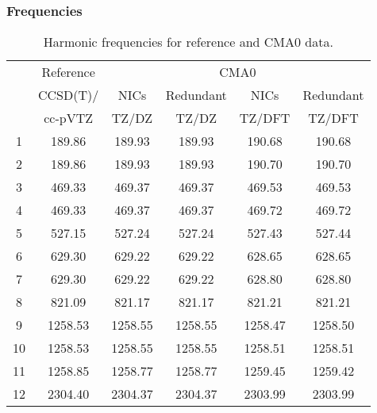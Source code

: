 \documentclass[10pt,oneside]{article}
\begin{document}
\begin{table}[h!]
\subsubsection*{Frequencies}
\centering
\caption{Harmonic frequencies for reference and CMA0 data.}
\begin{tabular}{cccccc}
\toprule
{} & Reference & \multicolumn{4}{c}{CMA0} \\
{} &  CCSD(T)/ &    NICs &  Redundant &    NICs & Redundant \\
{} &   cc-pVTZ &   TZ/DZ &      TZ/DZ &  TZ/DFT &    TZ/DFT \\
\midrule
1  &    189.86 &  189.93 &     189.93 &  190.68 &    190.68 \\
2  &    189.86 &  189.93 &     189.93 &  190.70 &    190.70 \\
3  &    469.33 &  469.37 &     469.37 &  469.53 &    469.53 \\
4  &    469.33 &  469.37 &     469.37 &  469.72 &    469.72 \\
5  &    527.15 &  527.24 &     527.24 &  527.43 &    527.44 \\
6  &    629.30 &  629.22 &     629.22 &  628.65 &    628.65 \\
7  &    629.30 &  629.22 &     629.22 &  628.80 &    628.80 \\
8  &    821.09 &  821.17 &     821.17 &  821.21 &    821.21 \\
9  &   1258.53 & 1258.55 &    1258.55 & 1258.47 &   1258.50 \\
10 &   1258.53 & 1258.55 &    1258.55 & 1258.51 &   1258.51 \\
11 &   1258.85 & 1258.77 &    1258.77 & 1259.45 &   1259.42 \\
12 &   2304.40 & 2304.37 &    2304.37 & 2303.99 &   2303.99 \\
\bottomrule
\end{tabular}
\end{table}
\end{document}
